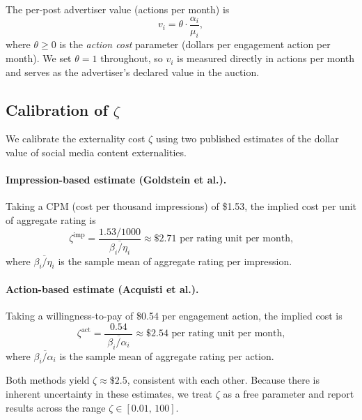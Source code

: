 \documentclass[11pt]{article}
\begin{document}
The per-post advertiser value (actions per month) is
\begin{equation}
    v_i = \theta \cdot \frac{\alpha_i}{\mu_i},
    \label{eq:v_score}
\end{equation}
where $\theta \geq 0$ is the \emph{action cost} parameter (dollars per engagement
action per month).  We set $\theta = 1$ throughout, so $v_i$ is measured directly
in actions per month and serves as the advertiser's declared value in the auction.

\subsection{Calibration of $\zeta$}
\label{sec:calibration}

We calibrate the externality cost $\zeta$ using two published estimates of the
dollar value of social media content externalities.

\paragraph{Impression-based estimate (Goldstein et al.).}
Taking a CPM (cost per thousand impressions) of \$1.53, the implied cost per unit
of aggregate rating is
\begin{equation}
    \zeta^{\text{imp}}
    = \frac{1.53/1000}{\;\overline{\beta_i/\eta_i}\;}
    \approx \$2.71 \text{ per rating unit per month,}
\end{equation}
where $\overline{\beta_i/\eta_i}$ is the sample mean of aggregate rating per impression.

\paragraph{Action-based estimate (Acquisti et al.).}
Taking a willingness-to-pay of \$0.54 per engagement action, the implied cost is
\begin{equation}
    \zeta^{\text{act}}
    = \frac{0.54}{\;\overline{\beta_i/\alpha_i}\;}
    \approx \$2.54 \text{ per rating unit per month,}
\end{equation}
where $\overline{\beta_i/\alpha_i}$ is the sample mean of aggregate rating per action.

Both methods yield $\zeta \approx \$2.5$, consistent with each other.  Because
there is inherent uncertainty in these estimates, we treat $\zeta$ as a free
parameter and report results across the range $\zeta \in [0.01,\, 100]$.


\end{document}
